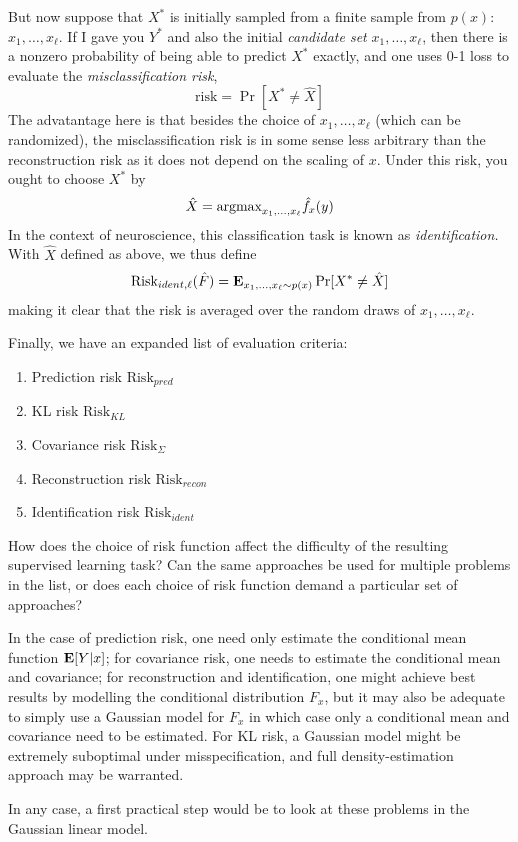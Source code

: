 \documentclass[12pt]{article}
\begin{document}
But now suppose that $X^*$ is initially sampled from a finite sample
from $p(x)$: $x_1,\hdots, x_\ell$.  If I gave you $Y^*$ and also the
initial \emph{candidate set} $x_1,\hdots, x_\ell$, then there is a
nonzero probability of being able to predict $X^*$ exactly, and one uses
0-1 loss to evaluate the \emph{misclassification risk},
\[
\text{risk} = \Pr[X^* \neq \hat{X}]
\]
The advatantage here is that besides the choice of $x_1,\hdots,
x_\ell$ (which can be randomized), the misclassification risk is in
some sense less arbitrary than the reconstruction risk as it does not
depend on the scaling of $x$.  Under this risk, you ought to choose
$X^*$ by
\[
\hat{X} = \text{argmax}_{x_1,\hdots, x_\ell} \hat{f}_x(y)
\]
In the context of neuroscience, this classification task is known as \emph{identification.}
With $\hat{X}$ defined as above, we thus define
\[
\text{Risk}_{ident, \ell}(\hat{F}) = \textbf{E}_{x_1,\hdots, x_\ell \sim p(x)} \Pr[X^* \neq \hat{X}]
\]
making it clear that the risk is averaged over the random draws of $x_1,\hdots, x_\ell$.

Finally, we have an expanded list of evaluation criteria:
\begin{enumerate}
\item Prediction risk $\text{Risk}_{pred}$
\item KL risk $\text{Risk}_{KL}$
\item Covariance risk $\text{Risk}_{\Sigma}$
\item Reconstruction risk $\text{Risk}_{recon}$
\item Identification risk $\text{Risk}_{ident}$
\end{enumerate}

How does the choice of risk function affect the difficulty of the
resulting supervised learning task?  Can the same approaches be used
for multiple problems in the list, or does each choice of risk
function demand a particular set of approaches?

In the case of prediction risk, one need only estimate the
conditional mean function $\textbf{E}[Y|x]$; for covariance risk, one needs to
estimate the conditional mean and covariance; for reconstruction and
identification, one might achieve best results by modelling the
conditional distribution $F_x$, but it may also be adequate to simply
use a Gaussian model for $F_x$ in which case only a conditional mean
and covariance need to be estimated.  For KL risk, a Gaussian model
might be extremely suboptimal under misspecification, and full
density-estimation approach may be warranted.

In any case, a first practical step would be to look at these problems
in the Gaussian linear model.
\end{document}
